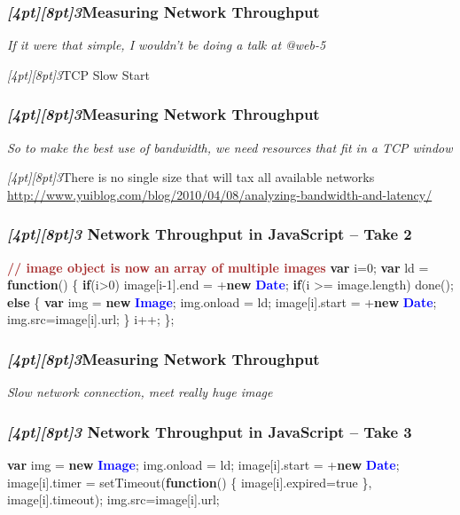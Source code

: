 \documentclass{beamer}
\newcommand{\sn}[1]{\textrm{\textit{\Huge{\raisebox{-3pt}[4pt][8pt]{\textcolor{f2elblue}{#1}}}}}\hspace{4pt}}
\newcommand{\innersplash}[1]{
  \begin{center}
    \large \textrm{\textit{ #1 } }
  \end{center}
}
\newcommand{\splashslide}[2][{}]{
  \begin{frame}
  \frametitle{#1}
  \innersplash{#2}
  \end{frame}
}
\def\brown<#1>#2{\textcolor<#1>{brown}{\textbf<#1>{#2}}}
\def\green<#1>#2{\textcolor<#1>{dark-green}{\textbf<#1>{#2}}}
\def\blue<#1>#2{\textcolor<#1>{blue}{\textbf<#1>{#2}}}
\begin{document}
\splashslide[\sn{3}Measuring Network Throughput]{If it were that simple, I wouldn't be doing a talk at @web-5}

\begin{frame}{\sn{3}TCP Slow Start}
\end{frame}

\splashslide[\sn{3}Measuring Network Throughput]{So to make the best use of bandwidth, we need resources that fit in a TCP window}

\begin{frame}{\sn{3}There is no single size that will tax all available networks }
\vspace{6cm}
\tiny \href{http://www.yuiblog.com/blog/2010/04/08/analyzing-bandwidth-and-latency/}{http://www.yuiblog.com/blog/2010/04/08/analyzing-bandwidth-and-latency/}
\end{frame}

\begin{frame}[fragile]
\frametitle{\sn{3} Network Throughput in JavaScript -- Take 2}
\begin{semiverbatim}
\brown<1>{// image object is now an array of multiple images}
\green<1>{var} i=0;
\green<1>{var} ld = \green<1>{function}() \{
   \green<1>{if}(i>0)
      image[i-1].end = +\green<1>{new} \blue<1>{Date};
   \green<1>{if}(i >= image.length)
      done();
   \green<1>{else} \{
      \green<1>{var} img = \green<1>{new} \blue<1>{Image};
      img.onload = ld;
      image[i].start = +\green<1>{new} \blue<1>{Date};
      img.src=image[i].url;
   \}
   i++;
\};
\end{semiverbatim}
\end{frame}

\splashslide[\sn{3}Measuring Network Throughput]{Slow network connection, meet really huge image}

\begin{frame}[fragile]
\frametitle{\sn{3} Network Throughput in JavaScript -- Take 3}
\begin{semiverbatim}
   \green<1>{var} img = \green<1>{new} \blue<1>{Image};
   img.onload = ld;
   image[i].start = +\green<1>{new} \blue<1>{Date};
   image[i].timer =
         setTimeout(\green<1>{function}() \{
                       image[i].expired=true
                    \},
                    image[i].timeout);
   img.src=image[i].url;
\end{semiverbatim}
\end{frame}
\end{document}
